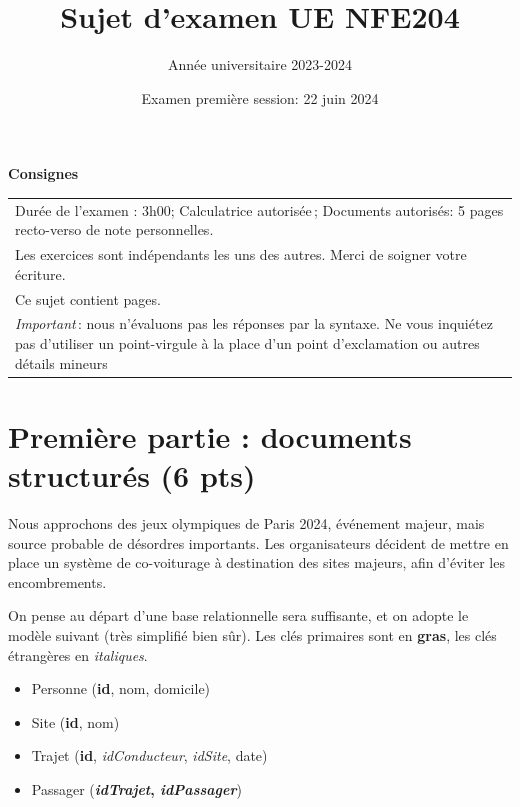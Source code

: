 \documentclass[10pt,a4paper]{article}
\begin{document}
\title{Sujet d'examen UE NFE204}
\author{Année universitaire 2023-2024}
\date{Examen première session: 22 juin 2024}

\maketitle

\begin{center}
{\bf \Large Consignes}\\
\begin{tabular}{| p{15cm} |}
\hline
Dur\'ee de l'examen : 3h00; Calculatrice autoris\'ee\,; Documents autorisés: 5 pages recto-verso de note personnelles.\\

Les exercices sont indépendants les uns des autres. Merci de soigner votre écriture.\\
Ce sujet contient \pageref{LastPage} pages.\\

\textit{Important}\,: nous n'évaluons pas les réponses par la syntaxe. Ne vous
inquiétez pas d'utiliser un point-virgule à la place d'un point d'exclamation ou
autres détails mineurs
\\
\hline
\end{tabular}
\end{center}

\section*{Première partie : documents structurés (6 pts)}

Nous approchons des jeux olympiques de Paris 2024, événement majeur,
mais source probable de désordres importants. Les organisateurs 
décident de mettre en place un système de co-voiturage à destination
des sites majeurs, afin d'éviter les encombrements.
 
On pense au départ d'une base relationnelle sera suffisante, et on
adopte le modèle suivant (très simplifié bien sûr). Les clés
primaires sont en \textbf{gras}, les clés étrangères en 
\textit{italiques}.

\begin{itemize}
  \item Personne   (\textbf{id}, nom, domicile)
  \item Site (\textbf{id}, nom)
  \item Trajet (\textbf{id}, \textit{idConducteur}, \textit{idSite}, date)
  \item Passager (\textbf{\textit{idTrajet}, \textit{idPassager}})
\end{itemize}
\end{document}
